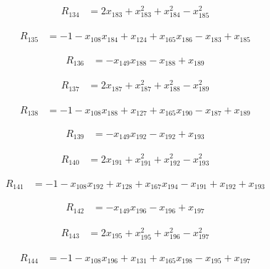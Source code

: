 \documentclass[11pt,letterpaper]{article}
\theoremstyle{definition}
\theoremstyle{remark}
\begin{document}
\begin{align*}
R_{134} &= 2 x_{183} +x_{183}^{2} +x_{184}^{2} -x_{185}^{2}
\end{align*}

\begin{align*}
R_{135} &= -1 -x_{108} x_{184} +x_{124} +x_{165} x_{186} -x_{183} +x_{185}
\end{align*}

\begin{align*}
R_{136} &= -x_{149} x_{188} -x_{188} +x_{189}
\end{align*}

\begin{align*}
R_{137} &= 2 x_{187} +x_{187}^{2} +x_{188}^{2} -x_{189}^{2}
\end{align*}

\begin{align*}
R_{138} &= -1 -x_{108} x_{188} +x_{127} +x_{165} x_{190} -x_{187} +x_{189}
\end{align*}

\begin{align*}
R_{139} &= -x_{149} x_{192} -x_{192} +x_{193}
\end{align*}

\begin{align*}
R_{140} &= 2 x_{191} +x_{191}^{2} +x_{192}^{2} -x_{193}^{2}
\end{align*}

\begin{align*}
R_{141} &= -1 -x_{108} x_{192} +x_{128} +x_{167} x_{194} -x_{191} +x_{192} +x_{193}
\end{align*}

\begin{align*}
R_{142} &= -x_{149} x_{196} -x_{196} +x_{197}
\end{align*}

\begin{align*}
R_{143} &= 2 x_{195} +x_{195}^{2} +x_{196}^{2} -x_{197}^{2}
\end{align*}

\begin{align*}
R_{144} &= -1 -x_{108} x_{196} +x_{131} +x_{165} x_{198} -x_{195} +x_{197}
\end{align*}
\end{document}
